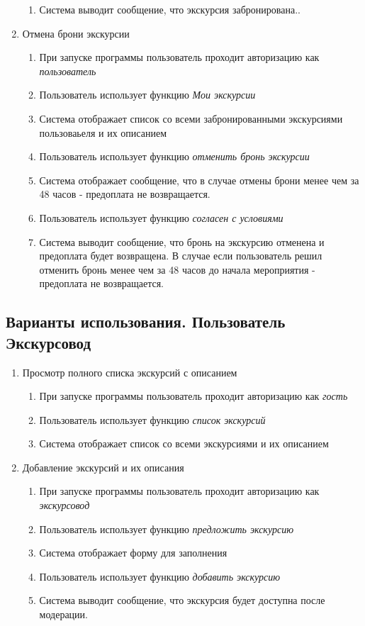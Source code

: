 \documentclass[12pt,a4paper]{article}
\begin{document}
\begin{enumerate}
\begin{enumerate}
\item Система выводит сообщение, что экскурсия забронирована..
\end{enumerate}
\item Отмена брони экскурсии
\begin{enumerate}
\item При запуске программы пользователь проходит авторизацию как \textit{пользователь}
\item Пользователь использует функцию \textit{Мои экскурсии}
\item Система отображает список со всеми забронированными экскурсиями пользоваьеля и их описанием
\item Пользователь использует функцию \textit{отменить бронь экскурсии}
\item Система отображает сообщение, что в случае отмены брони менее чем за 48 часов - предоплата не возвращается.
\item Пользователь использует функцию \textit{согласен с условиями}
\item Система выводит сообщение, что бронь на экскурсию отменена и предоплата будет возвращена. В случае если пользователь решил отменить бронь менее чем за 48 часов до начала мероприятия - предоплата не возвращается.
\end{enumerate}
\end{enumerate}
\subsection{Варианты использования. Пользователь Экскурсовод}
\begin{enumerate}
\item Просмотр полного списка экскурсий с описанием
\begin{enumerate}
\item При запуске программы пользователь проходит авторизацию как \textit{гость}
\item Пользователь использует функцию \textit{список экскурсий}
\item Система отображает список со всеми экскурсиями и их описанием
\end{enumerate}
\item Добавление экскурсий и их описания
\begin{enumerate}
\item При запуске программы пользователь проходит авторизацию как \textit{экскурсовод}
\item Пользователь использует функцию \textit{предложить экскурсию}
\item Система отображает форму для заполнения
\item Пользователь использует функцию \textit{добавить экскурсию}
\item Система выводит сообщение, что экскурсия будет доступна после модерации.
\end{enumerate}
\end{enumerate}
\end{document}
